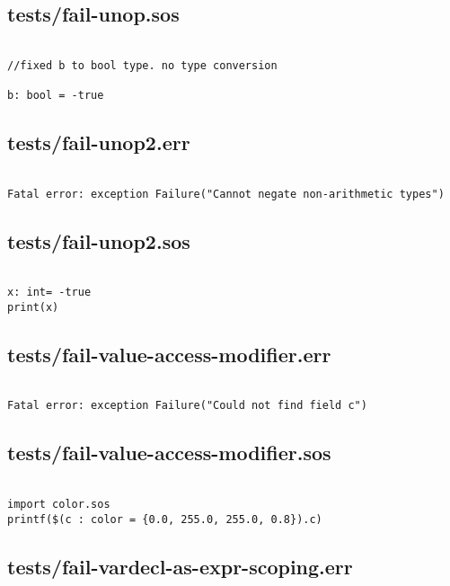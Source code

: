 \documentclass[main.tex]{subfiles}
\begin{document}
\subsection{tests/fail-unop.sos}

\begin{lstlisting}

//fixed b to bool type. no type conversion

b: bool = -true
\end{lstlisting}

\subsection{tests/fail-unop2.err}

\begin{lstlisting}

Fatal error: exception Failure("Cannot negate non-arithmetic types")
\end{lstlisting}

\subsection{tests/fail-unop2.sos}

\begin{lstlisting}

x: int= -true
print(x)
\end{lstlisting}

\subsection{tests/fail-value-access-modifier.err}

\begin{lstlisting}

Fatal error: exception Failure("Could not find field c")
\end{lstlisting}

\subsection{tests/fail-value-access-modifier.sos}

\begin{lstlisting}

import color.sos
printf($(c : color = {0.0, 255.0, 255.0, 0.8}).c)\end{lstlisting}

\subsection{tests/fail-vardecl-as-expr-scoping.err}
\end{document}
